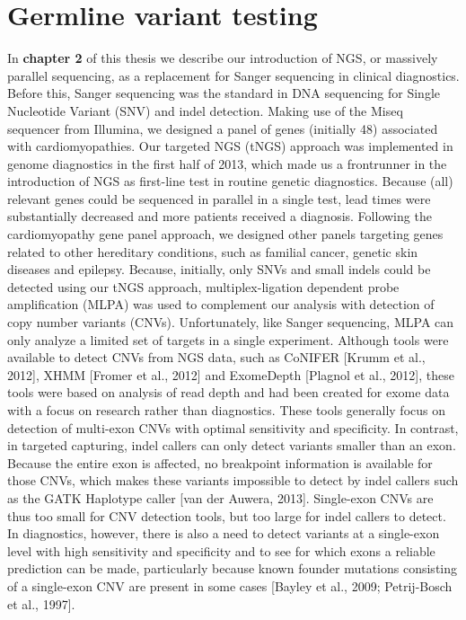 \section{Germline variant testing} \label{Germline}
In \textbf{chapter 2} of this thesis we describe our introduction of NGS, or massively parallel sequencing, as a replacement for Sanger sequencing in clinical diagnostics. 
Before this, Sanger sequencing was the standard in DNA sequencing for Single Nucleotide Variant (SNV) and indel detection. 
Making use of the Miseq sequencer from Illumina, we designed a panel of genes (initially 48) associated with cardiomyopathies. 
Our targeted NGS (tNGS) approach was implemented in genome diagnostics in the first half of 2013, which made us a frontrunner in the introduction of NGS as first-line test in routine genetic diagnostics. Because (all) relevant genes could be sequenced in parallel in a single test, lead times were substantially decreased and more patients received a diagnosis. 
Following the cardiomyopathy gene panel approach, we designed other panels targeting genes related to other hereditary conditions, such as familial cancer, genetic skin diseases and epilepsy.
Because, initially, only SNVs and small indels could be detected using our tNGS approach, multiplex-ligation dependent probe amplification (MLPA) was used to complement our analysis with detection of copy number variants (CNVs). 
Unfortunately, like Sanger sequencing, MLPA can only analyze a limited set of targets in a single experiment. 
Although tools were available to detect CNVs from NGS data, such as CoNIFER [Krumm et al., 2012], XHMM [Fromer et al., 2012] and ExomeDepth [Plagnol et al., 2012], these tools were based on analysis of read depth and had been created for exome data with a focus on research rather than diagnostics. 
These tools generally focus on detection of multi-exon CNVs with optimal sensitivity and specificity. 
In contrast, in targeted capturing, indel callers can only detect variants smaller than an exon. 
Because the entire exon is affected, no breakpoint information is available for those CNVs, which makes these variants impossible to detect by indel callers such as the GATK Haplotype caller [van der Auwera, 2013].
Single-exon CNVs are thus too small for CNV detection tools, but too large for indel callers to detect.
In diagnostics, however, there is also a need to detect variants at a single-exon level with high sensitivity and specificity and to see for which exons a reliable prediction can be made, particularly because known founder mutations consisting of a single-exon CNV are present in some cases [Bayley et al., 2009; Petrij-Bosch et al., 1997]. 
